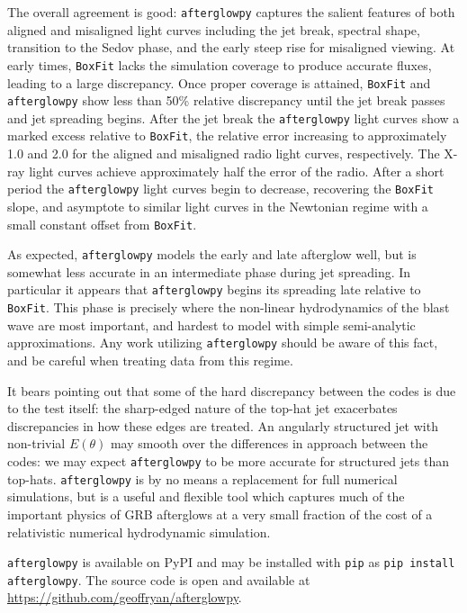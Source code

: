 \documentclass[twocolumn]{aastex62}
\newcommand{\afterglowpy}{{\tt afterglowpy}}
\newcommand{\boxfit}{{\tt BoxFit}}
\begin{document}
The overall agreement is good: \afterglowpy{} captures the salient features of both aligned and misaligned light curves including the jet break, spectral shape, transition to the Sedov phase, and the early steep rise for misaligned viewing.  
At early times, \boxfit{} lacks the simulation coverage to produce accurate fluxes, leading to a large discrepancy.  Once proper coverage is attained, \boxfit{} and \afterglowpy{} show less than 50\% relative discrepancy until the jet break passes and jet spreading begins.  After the jet break the \afterglowpy{} light curves show a marked excess relative to \boxfit{}, the relative error increasing to approximately 1.0 and 2.0 for the aligned and misaligned radio light curves, respectively.  The X-ray light curves achieve approximately half the error of the radio.  After a short period the \afterglowpy{} light curves begin to decrease, recovering the \boxfit{} slope, and asymptote to similar light curves in the Newtonian regime with a small constant offset from \boxfit{}.

As expected, \afterglowpy{} models the early and late afterglow well, but is somewhat less accurate in an intermediate phase during jet spreading.  In particular it appears that \afterglowpy{} begins its spreading late relative to \boxfit{}.  This phase is precisely where the non-linear hydrodynamics of the blast wave are most important, and hardest to model with simple semi-analytic approximations.  Any work utilizing \afterglowpy{} should be aware of this fact, and be careful when treating data from this regime.

It bears pointing out that some of the hard discrepancy between the codes is due to the test itself: the sharp-edged nature of the top-hat jet exacerbates discrepancies in how these edges are treated.  An angularly structured jet with non-trivial $E(\theta)$ may smooth over the differences in approach between the codes: we may expect \afterglowpy{} to be more accurate for structured jets than top-hats.  \afterglowpy{} is by no means a replacement for full numerical simulations, but is a useful and flexible tool which captures much of the important physics of GRB afterglows at a very small fraction of the cost of a relativistic numerical hydrodynamic simulation.

\afterglowpy{} is available on PyPI and may be installed with {\tt pip} as {\tt pip install afterglowpy}.  The source code is open and available at \url{https://github.com/geoffryan/afterglowpy}.

%
%
\end{document}
